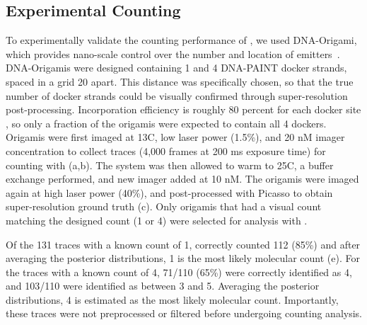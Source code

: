 \subsection{Experimental Counting}
To experimentally validate the counting performance of \ours, we used DNA-Origami, 
which provides nano-scale control over the number and location of emitters~\citep{rothemund_folding_2006}.
	DNA-Origamis were designed containing 1 and 4 DNA-PAINT docker strands, 
	spaced in a grid 20 \nanometer apart. 
	This distance was specifically chosen, so that the true number of docker strands 
	could be visually confirmed through super-resolution post-processing.
	Incorporation efficiency is roughly 80 percent for each docker site \cite{strauss_2018}, 
	so only a fraction of the origamis were expected to contain all 4 dockers. 
	Origamis were first imaged at 13\textdegree C, low laser power (1.5\%), and 20 nM imager concentration to 
	collect traces (4,000 frames at 200 ms exposure time) for counting with \ours (a,b).
	The system was then allowed to warm to 25\textdegree C, a buffer exchange performed, and new imager 
	added at 10 nM.
	The origamis were imaged again at high laser power (40\%),
	and post-processed with Picasso \citep{schnitzbauer_2017} to obtain super-resolution ground truth (c).
	Only origamis that had a visual count matching the designed count (1 or 4) were selected for analysis with \ours.

Of the 131 traces with a known count of 1, \ours correctly counted 112 (85\%)
and after averaging the posterior distributions, 1 is the most likely molecular count (e).
	For the traces with a known count of 4, 71/110 (65\%) were correctly identified as 4, 
	and 103/110 were identified as between 3 and 5. 
	Averaging the posterior distributions, 4 is estimated as the most likely molecular count. 
	Importantly, these traces were not preprocessed or filtered before undergoing \ours counting analysis.
